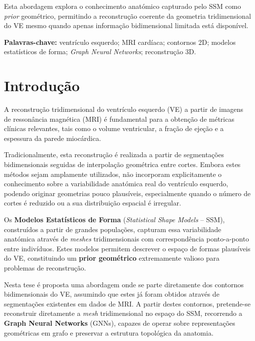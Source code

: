 \documentclass[12pt,a4paper]{report}
\begin{document}
Esta abordagem explora o conhecimento anatómico capturado pelo SSM como \textit{prior} geométrico, permitindo a reconstrução coerente da geometria tridimensional do VE mesmo quando apenas informação bidimensional limitada está disponível.

\vspace*{\fill}

\noindent\textbf{Palavras-chave:} ventrículo esquerdo; MRI cardíaca; contornos 2D; modelos estatísticos de forma; \textit{Graph Neural Networks}; reconstrução 3D.


\tableofcontents
\newpage

\chapter{Introdução}

A reconstrução tridimensional do ventrículo esquerdo (VE) a partir de imagens de ressonância magnética (MRI) é fundamental para a obtenção de métricas clínicas relevantes, tais como o volume ventricular, a fração de ejeção e a espessura da parede miocárdica.

Tradicionalmente, esta reconstrução é realizada a partir de segmentações bidimensionais seguidas de interpolação geométrica entre cortes. Embora estes métodos sejam amplamente utilizados, não incorporam explicitamente o conhecimento sobre a variabilidade anatómica real do ventrículo esquerdo, podendo originar geometrias pouco plausíveis, especialmente quando o número de cortes é reduzido ou a sua distribuição espacial é irregular.

Os \textbf{Modelos Estatísticos de Forma} (\textit{Statistical Shape Models} – SSM), construídos a partir de grandes populações, capturam essa variabilidade anatómica através de \textit{meshes} tridimensionais com correspondência ponto-a-ponto entre indivíduos. Estes modelos permitem descrever o espaço de formas plausíveis do VE, constituindo um \textbf{prior geométrico} extremamente valioso para problemas de reconstrução.

Nesta tese é proposta uma abordagem onde se parte diretamente dos contornos bidimensionais do VE, assumindo que estes já foram obtidos através de segmentações existentes em dados de MRI. A partir destes contornos, pretende-se reconstruir diretamente a \textit{mesh} tridimensional no espaço do SSM, recorrendo a \textbf{Graph Neural Networks} (GNNs), capazes de operar sobre representações geométricas em grafo e preservar a estrutura topológica da anatomia.
\end{document}

